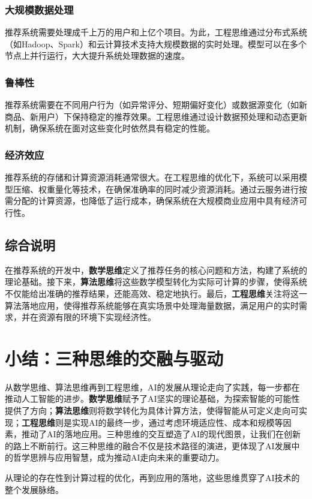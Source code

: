 \subsubsection*{大规模数据处理}
推荐系统需要处理成千上万的用户和上亿个项目。为此，工程思维通过分布式系统（如Hadoop、Spark）和云计算技术支持大规模数据的实时处理。模型可以在多个节点上并行运行，大大提升系统处理数据的速度。

\subsubsection*{鲁棒性}
推荐系统需要在不同用户行为（如异常评分、短期偏好变化）或数据源变化（如新商品、新用户）下保持稳定的推荐效果。工程思维通过设计数据预处理和动态更新机制，确保系统在面对这些变化时依然具有稳定的性能。

\subsubsection*{经济效应}
推荐系统的存储和计算资源消耗通常很大。在工程思维的优化下，系统可以采用模型压缩、权重量化等技术，在确保准确率的同时减少资源消耗。通过云服务进行按需分配的计算资源，也降低了运行成本，确保系统在大规模商业应用中具有经济可行性。


\subsection{ 综合说明}

在推荐系统的开发中，{\bf 数学思维}定义了推荐任务的核心问题和方法，构建了系统的理论基础。接下来，{\bf 算法思维}将这些数学模型转化为实际可计算的步骤，使得系统不仅能给出准确的推荐结果，还能高效、稳定地执行。最后，{\bf 工程思维}关注将这一算法落地应用，使得推荐系统能够在真实场景中处理海量数据，满足用户的实时需求，并在资源有限的环境下实现经济性。


\section{ 小结：三种思维的交融与驱动}

从数学思维、算法思维再到工程思维，AI的发展从理论走向了实践，每一步都在推动人工智能的进步。{\bf 数学思维}赋予了AI坚实的理论基础，为探索智能的可能性提供了方向；{\bf 算法思维}则将数学转化为具体计算方法，使得智能从可定义走向可实现；{\bf 工程思维}则是实现AI的最终一步，通过考虑环境适应性、成本和规模等因素，推动了AI的落地应用。三种思维的交互塑造了AI的现代图景，让我们在创新的路上不断前行。这三种思维的融合不仅是技术路径的演进，更体现了AI发展中的哲学思辨与应用智慧，成为推动AI走向未来的重要动力。

从理论的存在性到计算过程的优化，再到应用的落地，这些思维贯穿了AI技术的整个发展脉络。

\nocite{*}
\printbibliography[heading=bibintoc, title=\ebibname]


\newpage